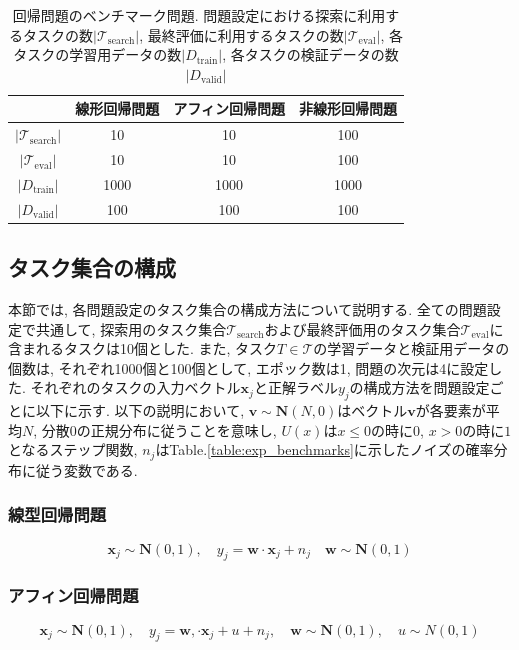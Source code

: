 \documentclass[11pt,oneside,openany,report]{jsbook}
\begin{document}
\begin{table}[tbp]
  \caption{回帰問題のベンチマーク問題. 問題設定における探索に利用するタスクの数$\left|\mathcal{T}_\mathrm{search} \right|$, 最終評価に利用するタスクの数$\left|\mathcal{T}_\mathrm{eval} \right|$, 各タスクの学習用データの数$\left|D_\mathrm{train}\right|$, 各タスクの検証データの数$\left|D_\mathrm{valid}\right|$}
  \label{table:regression_exp_benchmark}
  \centering
  \begin{tabular}{|c|c|c|c|}
    \hline
    & 線形回帰問題 & アフィン回帰問題 & 非線形回帰問題 \\
    \hline
    \hline
    $\left|\mathcal{T}_\mathrm{search} \right|$ & 10 & 10 & 100 \\
    $\left|\mathcal{T}_\mathrm{eval} \right|$ & 10 & 10 & 100 \\
    $\left|D_\mathrm{train}\right|$ & 1000 & 1000 & 1000 \\
    $\left|D_\mathrm{valid}\right|$ & 100 & 100 & 100 \\
    \hline
  \end{tabular}
\end{table}

\subsection{タスク集合の構成}
本節では, 各問題設定のタスク集合の構成方法について説明する. 全ての問題設定で共通して, 探索用のタスク集合$\mathcal{T}_\mathrm{search}$および最終評価用のタスク集合$\mathcal{T}_\mathrm{eval}$に含まれるタスクは10個とした. また, タスク$T \in \mathcal{T}$の学習データと検証用データの個数は, それぞれ1000個と100個として, エポック数は1, 問題の次元は4に設定した. それぞれのタスクの入力ベクトル$\bm{x}_j$と正解ラベル$y_j$の構成方法を問題設定ごとに以下に示す. 以下の説明において, $\bm{v} \sim \bm{N}(N,0)$はベクトル$\bm{v}$が各要素が平均$N$, 分散$0$の正規分布に従うことを意味し, $U(x)$は$x \leq 0$の時に$0$, $x > 0$の時に$1$となるステップ関数, $n_j$はTable.\ref{table:exp_benchmarks}に示したノイズの確率分布に従う変数である.

\subsubsection{線型回帰問題}
$$
  \bm{x}_j \sim \bm{N}(0, 1), \quad y_j = \bm{w} \cdot \bm{x}_j + n_j \quad
  \bm{w} \sim \bm{N}(0, 1)
$$

\subsubsection{アフィン回帰問題}
$$
  \bm{x}_j \sim \bm{N}(0, 1), \quad y_j = \bm{w}, \cdot \bm{x}_j + u + n_j,\quad \bm{w} \sim \bm{N}(0, 1), \quad u \sim N(0, 1)
$$
\end{document}
